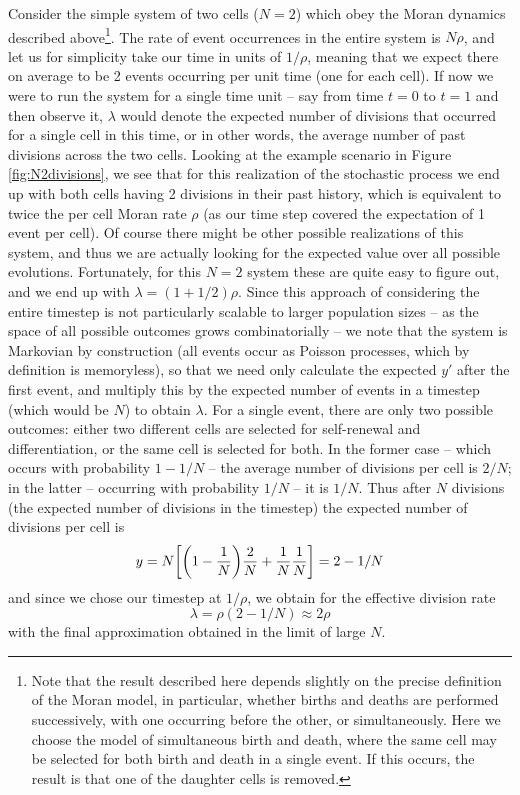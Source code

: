 \documentclass[pdftex,12pt,a4paper]{scrartcl}
\begin{document}
Consider the simple system of two cells ($N=2$) which obey the Moran dynamics described above\footnote{Note that the result described here depends slightly on the precise definition of the Moran model, in particular, whether births and deaths are performed successively, with one occurring before the other, or simultaneously. Here we choose the model of simultaneous birth and death, where the same cell may be selected for both birth and death in a single event. If this occurs, the result is that one of the daughter cells is removed.}. The rate of event occurrences in the entire system is $N\rho$, and let us for simplicity take our time in units of $1/\rho$, meaning that we expect there on average to be 2 events occurring per unit time (one for each cell). If now we were to run the system for a single time unit -- say from time $t=0$ to $t=1$ and then observe it, $\lambda$ would denote the expected number of divisions that occurred for a single cell in this time, or in other words, the average number of past divisions across the two cells. Looking at the example scenario in Figure \ref{fig:N2divisions}, we see that for this realization of the stochastic process we end up with both cells having 2 divisions in their past history, which is equivalent to twice the per cell Moran rate $\rho$ (as our time step covered the expectation of 1 event per cell). Of course there might be other possible realizations of this system, and thus we are actually looking for the expected value over all possible evolutions. Fortunately, for this $N=2$ system these are quite easy to figure out, and we end up with $\lambda = (1+1/2)\rho$. Since this approach of considering the entire timestep is not particularly scalable to larger population sizes -- as the space of all possible outcomes grows combinatorially -- we note that the system is Markovian by construction (all events occur as Poisson processes, which by definition is memoryless), so that we need only calculate the expected $y'$ after the first event, and multiply this by the expected number of events in a timestep (which would be $N$) to obtain $\lambda$. For a single event, there are only two possible outcomes: either two different cells are selected for self-renewal and differentiation, or the same cell is selected for both. In the former case -- which occurs with probability $1-1/N$ -- the average number of divisions per cell is $2/N$; in the latter -- occurring with probability $1/N$ -- it is $1/N$. Thus after $N$ divisions (the expected number of divisions in the timestep) the expected number of divisions per cell is 
\begin{equation}
   y = N \qty[ \qty(1-\frac{1}{N})\frac{2}{N} + \frac{1}{N}\frac{1}{N} ] = 2 - 1/N
\end{equation}
and since we chose our timestep at $1/\rho$, we obtain for the effective division rate
\begin{equation}
    \lambda = \rho (2-1/N) \approx 2\rho
\end{equation}
with the final approximation obtained in the limit of large $N$.
\end{document}
